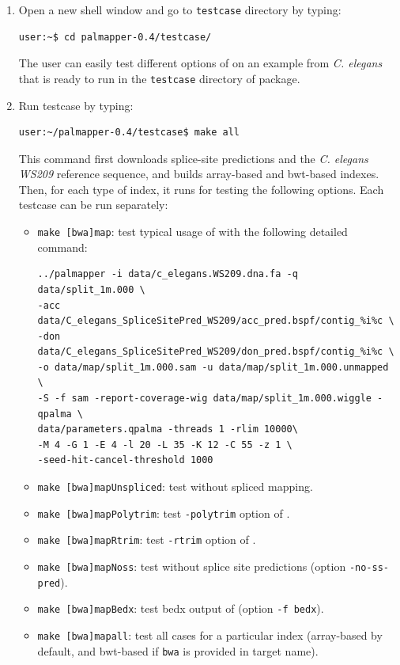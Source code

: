 \documentclass{article}
\begin{document}
\begin{enumerate}
\item Open a new shell window and go to \texttt{testcase} directory by
  typing: 
\begin{verbatim}
user:~$ cd palmapper-0.4/testcase/
\end{verbatim}
The user can easily test different options of \PALMapper{} on an
example from \emph{C. elegans} that is ready to run in the
\texttt{testcase} directory of \PALMapper{} package.
\item Run testcase by typing:
\begin{verbatim}
user:~/palmapper-0.4/testcase$ make all
\end{verbatim}
This command first downloads splice-site predictions and the
\emph{C. elegans WS209} reference sequence, and builds array-based and
bwt-based indexes. Then, for each type of index, it runs \PALMapper{}
for testing the following options. Each testcase can be run separately:
\begin{itemize}
\item \texttt{make [bwa]map}: test typical usage of \PALMapper{} with
  the following detailed command:
\begin{verbatim}
../palmapper -i data/c_elegans.WS209.dna.fa -q data/split_1m.000 \
-acc data/C_elegans_SpliceSitePred_WS209/acc_pred.bspf/contig_%i%c \
-don data/C_elegans_SpliceSitePred_WS209/don_pred.bspf/contig_%i%c \
-o data/map/split_1m.000.sam -u data/map/split_1m.000.unmapped \
-S -f sam -report-coverage-wig data/map/split_1m.000.wiggle -qpalma \
data/parameters.qpalma -threads 1 -rlim 10000\
-M 4 -G 1 -E 4 -l 20 -L 35 -K 12 -C 55 -z 1 \
-seed-hit-cancel-threshold 1000
\end{verbatim}
\item \texttt{make [bwa]mapUnspliced}: test \PALMapper{} without
  spliced mapping.
\item \texttt{make [bwa]mapPolytrim}: test \texttt{-polytrim} option
  of \PALMapper{}.
\item \texttt{make [bwa]mapRtrim}: test \texttt{-rtrim} option
  of \PALMapper{}.
\item \texttt{make [bwa]mapNoss}: test \PALMapper{} without splice
  site predictions (option \texttt{-no-ss-pred}).
\item \texttt{make [bwa]mapBedx}: test bedx output of \PALMapper{}
  (option \texttt{-f bedx}).
\item \texttt{make [bwa]mapall}: test all cases for a particular index
  (array-based by default, and bwt-based if \texttt{bwa} is provided
  in target name). 
\end{itemize}


\end{enumerate}
\end{document}
